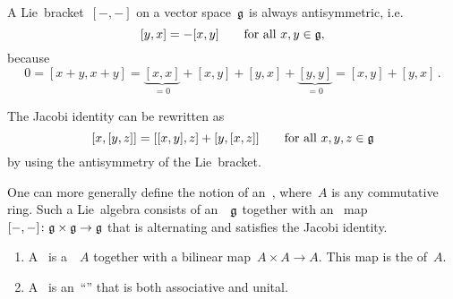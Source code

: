 \begin{remark}
  A Lie~bracket~$[-, -]$ on a vector space~$\mathfrak{g}$ is always antisymmetric, i.e.
  \[
    [y,x] = -[x,y]
    \qquad
    \text{for all~$x, y \in \mathfrak{g}$,}
  \]
  because
  \[
    0
    =
    [x+y, x+y]
    =
      \underbrace{ [x,x] }_{= 0}
    + [x,y]
    + [y,x]
    + \underbrace{ [y,y] }_{= 0}
    =
    [x,y] + [y,x] \,.
  \]
\end{remark}


\begin{remark}
  The Jacobi identity can be rewritten as
  \[
    [x,[y,z]]
    =
    [[x,y],z] + [y,[x,z]]
    \qquad
    \text{for all~$x, y, z \in \mathfrak{g}$}
  \]
  by using the antisymmetry of the Lie~bracket.
\end{remark}


\begin{remark}
  One can more generally define the notion of an~, where~$A$ is any commutative ring.
  Such a Lie~algebra consists of an~~$\mathfrak{g}$ together with an~ map~$[-,-] \colon \glie \times \glie \to \glie$ that is alternating and satisfies the Jacobi identity.
\end{remark}


\begin{definition}
  \leavevmode
  \begin{enumerate}
    \item
      A~ is a~\vectorspace{$\kf$}~$A$ together with a bilinear map~$A \times A \to A$.
      This map is the  of~$A$.
    \item
      A~ is an~\enquote{\algebra{$\kf$}} that is both associative and unital.
  \end{enumerate}
\end{definition}

